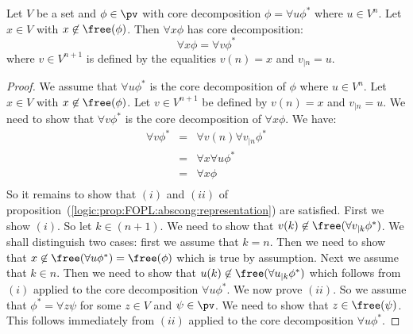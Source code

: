 \begin{lemma}\label{logic:lemma:FOPL:abscong:x:not:free}
Let $V$ be a set and $\phi\in\pv$ with core decomposition
$\phi=\forall u\phi^{*}$ where $u\in V^{n}$. Let $x\in V$ with
$x\not\in\free(\phi)$. Then $\forall x\phi$ has core decomposition:
    \[
    \forall x\phi=\forall v\phi^{*}
    \]
where $v\in V^{n+1}$ is defined by the equalities $v(n)=x$ and
$v_{|n}=u$.
\end{lemma}
\begin{proof}
We assume that $\forall u\phi^{*}$ is the core decomposition of
$\phi$ where $u\in V^{n}$. Let $x\in V$ with $x\not\in\free(\phi)$.
Let $v\in V^{n+1}$ be defined by $v(n)=x$ and $v_{|n}=u$. We need to
show that $\forall v\phi^{*}$ is the core decomposition of $\forall
x\phi$. We have:
    \begin{eqnarray*}
    \forall v\phi^{*}&=&\forall v(n)\forall v_{|n}\phi^{*}\\
    &=&\forall x\forall u\phi^{*}\\
    &=&\forall x\phi\\
    \end{eqnarray*}
So it remains to show that $(i)$ and $(ii)$ of
proposition~(\ref{logic:prop:FOPL:abscong:representation}) are
satisfied. First we show $(i)$. So let $k\in(n+1)$. We need to show
that $v(k)\not\in\free(\forall v_{|k}\phi^{*})$. We shall
distinguish two cases: first we assume that $k=n$. Then we need to
show that $x\not\in\free(\forall u\phi^{*})=\free(\phi)$ which is
true by assumption. Next we assume that $k\in n$. Then we need to
show that $u(k)\not\in\free(\forall u_{|k}\phi^{*})$ which follows
from $(i)$ applied to the core decomposition $\forall u\phi^{*}$. We
now prove $(ii)$. So we assume that $\phi^{*}=\forall z\psi$ for
some $z\in V$ and $\psi\in\pv$. We need to show that
$z\in\free(\psi)$. This follows immediately from $(ii)$ applied to
the core decomposition $\forall u\phi^{*}$.
\end{proof}
